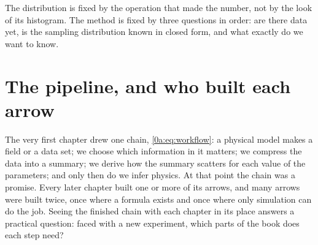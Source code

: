 \begin{keyidea}
The distribution is fixed by the operation that made the number, not by the look of
its histogram. The method is fixed by three questions in order: are there data yet,
is the sampling distribution known in closed form, and what exactly do we want to
know.
\end{keyidea}
\section{The pipeline, and who built each arrow}\label{14a:sec:pipeline}

The very first chapter drew one chain, \eqref{0a:eq:workflow}: a physical model makes
a field or a data set; we choose which information in it matters; we compress the
data into a summary; we derive how the summary scatters for each value of the
parameters; and only then do we infer physics. At that point the chain was a promise.
Every later chapter built one or more of its arrows, and many arrows were built
twice, once where a formula exists and once where only simulation can do the job.
Seeing the finished chain with each chapter in its place answers a practical question:
faced with a new experiment, which parts of the book does each step need?

